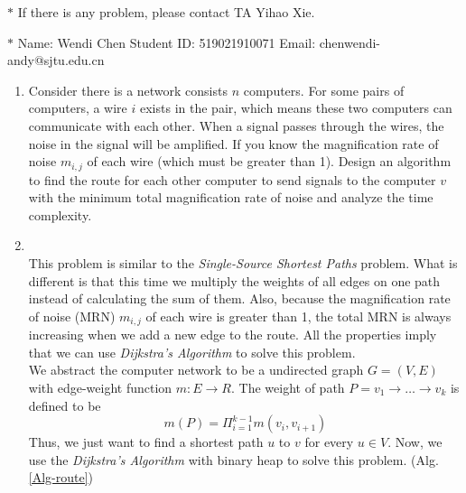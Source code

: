 \documentclass[12pt,a4paper]{article}
\makeatletter
\newtheorem*{solution}{Solution}
\theoremstyle{definition}
\renewenvironment{solution}[1][Solution] {\par\pushQED{\qed}\normalfont\topsep6\p@\@plus6\p@\relax\trivlist\item[\hskip\labelsep\bfseries#1\@addpunct{.}]\ignorespaces}{\popQED\endtrivlist\@endpefalse} \makeatother
\makeatother
\begin{document}
\noindent

\noindent{}
\begin{center}
\footnotesize{\color{red}$*$ If there is any problem, please contact TA Yihao Xie. }

\footnotesize{\color{blue}$*$ Name: Wendi Chen  \quad Student ID: 519021910071 \quad Email: chenwendi-andy@sjtu.edu.cn}
\end{center}

\begin{enumerate}
    \item  Consider there is a network consists $n$ computers. For some pairs of computers, a wire $i$ exists in the pair, which means these two computers can communicate with each other. When a signal passes through the wires, the noise in the signal will be amplified. If you know the magnification rate of noise $m_{i,j}$ of each wire (which must be greater than 1). Design an algorithm to find the route  for each other computer to send signals to the computer $v$ with the minimum total magnification rate of noise and analyze the time complexity.
    
    \begin{solution}
    ~\\
    This problem is similar to the \emph{Single-Source Shortest Paths} problem. What is different is that this time we multiply the weights of all edges on one path instead of calculating the sum of them. Also, because the magnification rate of noise (MRN) $m_{i,j}$ of each wire is greater than 1, the total MRN is always increasing when we add a new edge to the route. All the properties imply that we can use \emph{Dijkstra's Algorithm} to solve this problem.\\
    We abstract the computer network to be a undirected graph $G = (V,E)$ with edge-weight function $m:E\to R$. The weight of path $P = v_1\to \dots \to v_k$ is defined to be
    \begin{equation*}
        m(P) = \Pi_{i=1}^{k-1}m(v_i,v_{i+1})
    \end{equation*}
    Thus, we just want to find a shortest path $u$ to $v$ for every $u \in V$. Now, we use the \emph{Dijkstra's Algorithm} with binary heap to solve this problem. (Alg.\ref{Alg-route})
    

\end{solution}
\end{enumerate}
\end{document}

